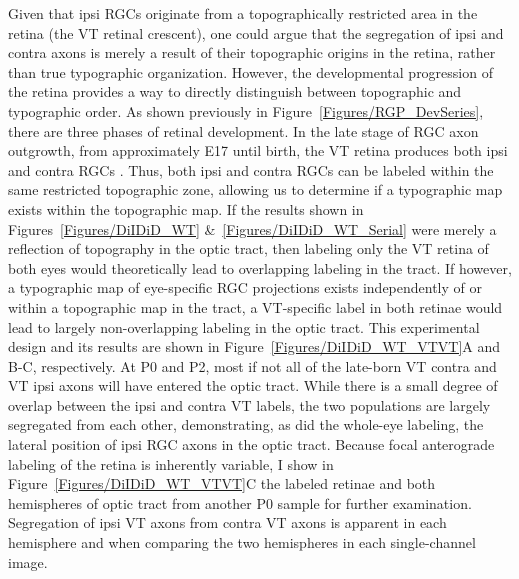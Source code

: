 Given that ipsi RGCs originate from a topographically restricted area in the retina (the VT retinal crescent), one could argue that the segregation of ipsi and contra axons is merely a result of their topographic origins in the retina, rather than true typographic organization.
However, the developmental progression of the retina provides a way to directly distinguish between topographic and typographic order.
As shown previously in Figure~\ref{Figures/RGP_DevSeries}, there are three phases of retinal development.
In the late stage of RGC axon outgrowth, from approximately E17 until birth, the VT retina produces both ipsi and contra RGCs \cite{drager1985birth}.
Thus, both ipsi and contra RGCs can be labeled within the same restricted topographic zone, allowing us to determine if a typographic map exists within the topographic map.
If the results shown in Figures~\ref{Figures/DiIDiD_WT} \&~\ref{Figures/DiIDiD_WT_Serial} were merely a reflection of topography in the optic tract, then labeling only the VT retina of both eyes would theoretically lead to overlapping labeling in the tract.
If however, a typographic map of eye-specific RGC projections exists independently of or within a topographic map in the tract, a VT-specific label in both retinae would lead to largely non-overlapping labeling in the optic tract.
This experimental design and its results are shown in Figure~\ref{Figures/DiIDiD_WT_VTVT}A and B-C, respectively.
At P0 and P2, most if not all of the late-born VT contra and VT ipsi axons will have entered the optic tract.
While there is a small degree of overlap between the ipsi and contra VT labels, the two populations are largely segregated from each other, demonstrating, as did the whole-eye labeling, the lateral position of ipsi RGC axons in the optic tract.
Because focal anterograde labeling of the retina is inherently variable, I show in Figure~\ref{Figures/DiIDiD_WT_VTVT}C the labeled retinae and both hemispheres of optic tract from another P0 sample for further examination.
Segregation of ipsi VT axons from contra VT axons is apparent in each hemisphere and when comparing the two hemispheres in each single-channel image.
